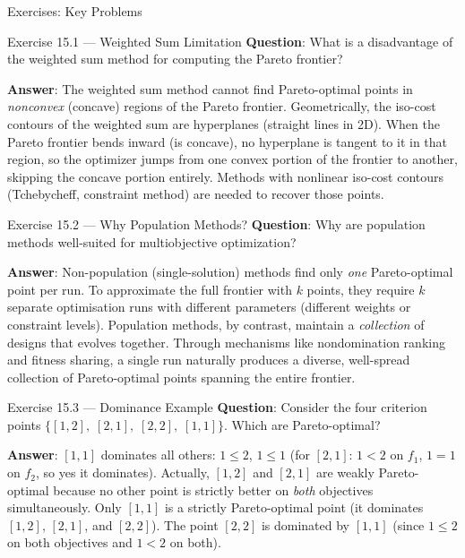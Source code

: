 \documentclass[aspectratio=169,10pt]{beamer}
\begin{document}
\begin{frame}[allowframebreaks]{Exercises: Key Problems}

\begin{block}{Exercise 15.1 --- Weighted Sum Limitation}
  \textbf{Question}: What is a disadvantage of the weighted sum method for
  computing the Pareto frontier?

  \textbf{Answer}: The weighted sum method cannot find Pareto-optimal points
  in \emph{nonconvex} (concave) regions of the Pareto frontier.  Geometrically,
  the iso-cost contours of the weighted sum are hyperplanes (straight lines in
  2D).  When the Pareto frontier bends inward (is concave), no hyperplane is
  tangent to it in that region, so the optimizer jumps from one convex portion
  of the frontier to another, skipping the concave portion entirely.  Methods
  with nonlinear iso-cost contours (Tchebycheff, constraint method) are needed
  to recover those points.
\end{block}

\begin{block}{Exercise 15.2 --- Why Population Methods?}
  \textbf{Question}: Why are population methods well-suited for multiobjective
  optimization?

  \textbf{Answer}: Non-population (single-solution) methods find only
  \emph{one} Pareto-optimal point per run.  To approximate the full frontier
  with $k$ points, they require $k$ separate optimisation runs with different
  parameters (different weights or constraint levels).  Population methods,
  by contrast, maintain a \emph{collection} of designs that evolves together.
  Through mechanisms like nondomination ranking and fitness sharing, a single
  run naturally produces a diverse, well-spread collection of Pareto-optimal
  points spanning the entire frontier.
\end{block}

\begin{block}{Exercise 15.3 --- Dominance Example}
  \textbf{Question}: Consider the four criterion points
  $\{[1,2],\; [2,1],\; [2,2],\; [1,1]\}$.  Which are Pareto-optimal?

  \textbf{Answer}: $[1,1]$ dominates all others: $1 \le 2$, $1 \le 1$
  (for $[2,1]$: $1 < 2$ on $f_1$, $1 = 1$ on $f_2$, so yes it dominates).
  Actually, $[1,2]$ and $[2,1]$ are weakly Pareto-optimal because no other
  point is strictly better on \emph{both} objectives simultaneously.
  Only $[1,1]$ is a strictly Pareto-optimal point (it dominates $[1,2]$,
  $[2,1]$, and $[2,2]$).  The point $[2,2]$ is dominated by $[1,1]$
  (since $1 \le 2$ on both objectives and $1 < 2$ on both).
\end{block}

\end{frame}
\end{document}
